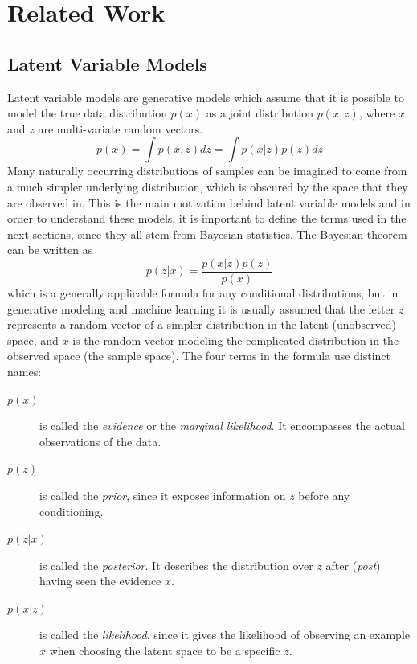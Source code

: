 %
\newpage
\chapter{Related Work}
\section{Latent Variable Models}
Latent variable models are generative models which assume that it is possible to model the true data distribution $p(x)$ as a joint distribution $p(x,z)$, where $x$ and $z$ are multi-variate random vectors.
\begin{equation}
    \label{eq:marginallikelihood}
    p(x) = \int p(x,z)dz = \int p(x|z)p(z)dz
\end{equation}
Many naturally occurring distributions of samples can be imagined to come from a much simpler underlying distribution, which is obscured by the space that they are observed in. This is the main motivation behind latent variable models and in order to understand these models, it is important to define the terms used in the next sections, since they all stem from Bayesian statistics. The Bayesian theorem can be written as
\begin{equation}
    \label{eq:bayestheorem}
    p(z|x) = \frac{p(x|z)p(z)}{p(x)}
\end{equation}
which is a generally applicable formula for any conditional distributions, but in generative modeling and machine learning it is usually assumed that the letter $z$ represents a random vector of a simpler distribution in the latent (unobserved) space, and $x$ is the random vector modeling the complicated distribution in the observed space (the sample space). The four terms in the formula use distinct names:
\begin{description}
    \item[$p(x)$] is called the \textit{evidence} or the \textit{marginal likelihood}. It encompasses the actual observations of the data.
    \item[$p(z)$] is called the \textit{prior}, since it exposes information on $z$ before any conditioning.
    \item[$p(z|x)$] is called the \textit{posterior}. It describes the distribution over $z$ after (\textit{post}) having seen the evidence $x$.
    \item[$p(x|z)$] is called the \textit{likelihood}, since it gives the likelihood of observing an example $x$ when choosing the latent space to be a specific $z$.
\end{description}

